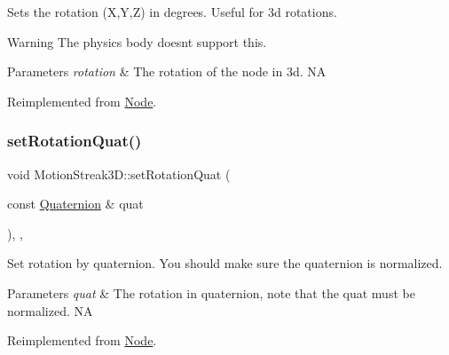 Sets the rotation (X,Y,Z) in degrees. Useful for 3d rotations.

\begin{DoxyWarning}{Warning}
The physics body doesn\textquotesingle{}t support this.
\end{DoxyWarning}

\begin{DoxyParams}{Parameters}
{\em rotation} & The rotation of the node in 3d.  NA \\
\hline
\end{DoxyParams}


Reimplemented from \hyperlink{classNode_a2ce988bebd6c8b804d8bfdfafd511c40}{Node}.

\mbox{\label{classMotionStreak3D_ab3b762bdfe6cbda5cda6b69ca8d31845}} 
\subsubsection{\texorpdfstring{set\+Rotation\+Quat()}{setRotationQuat()}\hspace{0.1cm}{\footnotesize\ttfamily [1/2]}}
{\footnotesize\ttfamily void Motion\+Streak3\+D\+::set\+Rotation\+Quat (\begin{DoxyParamCaption}\item[{const \hyperlink{classQuaternion}{Quaternion} \&}]{quat }\end{DoxyParamCaption})\hspace{0.3cm}{\ttfamily [inline]}, {\ttfamily [override]}, {\ttfamily [virtual]}}

Set rotation by quaternion. You should make sure the quaternion is normalized.


\begin{DoxyParams}{Parameters}
{\em quat} & The rotation in quaternion, note that the quat must be normalized.  NA \\
\hline
\end{DoxyParams}


Reimplemented from \hyperlink{classNode_a59c0b9e9afc4668320d90c340e5727e7}{Node}.

\mbox{\label{classMotionStreak3D_a7e9e94bce7204f28d6b8dff196d163d9}} 
